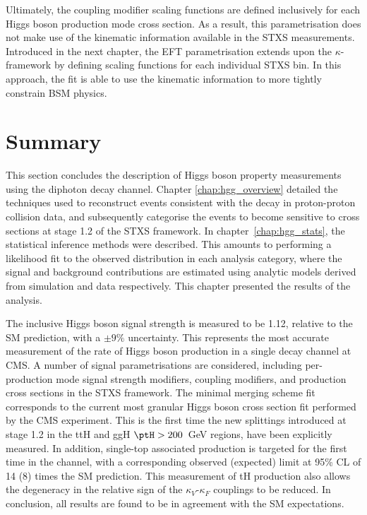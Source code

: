 Ultimately, the coupling modifier scaling functions are defined inclusively for each Higgs boson production mode cross section. As a result, this parametrisation does not make use of the kinematic information available in the STXS measurements. Introduced in the next chapter, the EFT parametrisation extends upon the $\kappa$-framework by defining scaling functions for each individual STXS bin. In this approach, the fit is able to use the kinematic information to more tightly constrain BSM physics.

\section{Summary}
This section concludes the description of Higgs boson property measurements using the diphoton decay channel. Chapter \ref{chap:hgg_overview} detailed the techniques used to reconstruct events consistent with the \Hgg decay in proton-proton collision data, and subsequently categorise the events to become sensitive to cross sections at stage 1.2 of the STXS framework. In chapter~\ref{chap:hgg_stats}, the statistical inference methods were described. This amounts to performing a likelihood fit to the observed \mgg distribution in each analysis category, where the signal and background contributions are estimated using analytic models derived from simulation and data respectively. This chapter presented the results of the analysis.

The inclusive Higgs boson signal strength is measured to be 1.12, relative to the SM prediction, with a $\pm 9\%$ uncertainty. This represents the most accurate measurement of the rate of Higgs boson production in a single decay channel at CMS. A number of signal parametrisations are considered, including per-production mode signal strength modifiers, coupling modifiers, and production cross sections in the STXS framework. The minimal merging scheme fit corresponds to the current most granular Higgs boson cross section fit performed by the CMS experiment. This is the first time the new splittings introduced at stage 1.2 in the ttH and ggH $\ptH>200$~GeV regions, have been explicitly measured. In addition, single-top associated production is targeted for the first time in the \Hgg channel, with a corresponding observed (expected) limit at 95\% CL of 14 (8) times the SM prediction. This measurement of tH production also allows the degeneracy in the relative sign of the $\kappa_V$-$\kappa_F$ couplings to be reduced. In conclusion, all results are found to be in agreement with the SM expectations.